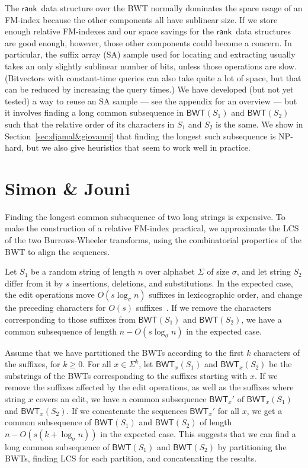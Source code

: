 \documentclass{llncs}
\newcommand{\BWT}
  {\ensuremath{\mathsf{BWT}}}
\newcommand{\rank}
  {\ensuremath{\mathsf{rank}}}
\begin{document}
The \rank\ data structure over the BWT normally dominates the space usage of an FM-index because the other components all have sublinear size.  If we store enough relative FM-indexes and our space savings for the \rank\ data structures are good enough, however, those other components could become a concern.  In particular, the suffix array (SA) sample used for locating and extracting usually takes an only slightly sublinear number of bits, unless those operations are slow.  (Bitvectors with constant-time queries can also take quite a lot of space, but that can be reduced by increasing the query times.)  We have developed (but not yet tested) a way to reuse an SA sample --- see the appendix for an overview --- but it involves finding a long common subsequence in \(\BWT (S_1)\) and \(\BWT (S_2)\) such that the relative order of its characters in $S_1$ and $S_2$ is the same.  We show in Section~\ref{sec:djamal&giovanni} that finding the longest such subsequence is NP-hard, but we also give heuristics that seem 
to work well in practice. 


\section{Simon \& Jouni}
\label{sec:simon&jouni}

Finding the longest common subsequence of two long strings is expensive. To make the construction of a relative FM-index practical, we approximate the LCS of the two Burrows-Wheeler transforms, using the combinatorial properties of the BWT to align the sequences.

Let $S_{1}$ be a random string of length $n$ over alphabet $\Sigma$ of size $\sigma$, and let string $S_{2}$ differ from it by $s$ insertions, deletions, and substitutions. In the expected case, the edit operations move $O(s \log_{\sigma} n)$ suffixes in lexicographic order, and change the preceding characters for $O(s)$ suffixes~\cite{MNSV10}. If we remove the characters corresponding to those suffixes from $\BWT(S_{1})$ and $\BWT(S_{2})$, we have a common subsequence of length $n - O(s \log_{\sigma} n)$ in the expected case.

Assume that we have partitioned the BWTs according to the first $k$ characters of the suffixes, for $k \ge 0$. For all $x \in \Sigma^{k}$, let $\BWT_{x}(S_{1})$ and $\BWT_{x}(S_{2})$ be the substrings of the BWTs corresponding to the suffixes starting with $x$. If we remove the suffixes affected by the edit operations, as well as the suffixes where string $x$ covers an edit, we have a common subsequence $\BWT_{x}'$ of $\BWT_{x}(S_{1})$ and $\BWT_{x}(S_{2})$. If we concatenate the sequences $\BWT_{x}'$ for all $x$, we get a common subsequence of $\BWT(S_{1})$ and $\BWT(S_{2})$ of length $n - O(s (k + \log_{\sigma} n))$ in the expected case. This suggests that we can find a long common subsequence of $\BWT(S_{1})$ and $\BWT(S_{2})$ by partitioning the BWTs, finding LCS for each partition, and concatenating the results.
\end{document}
